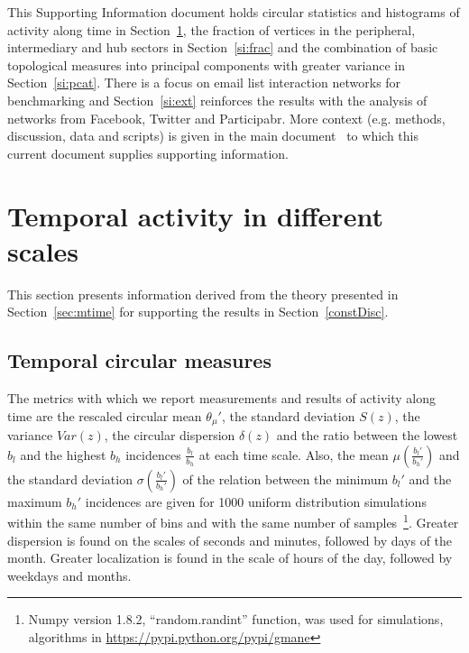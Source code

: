 \documentclass[%
 aip,
 jmp,%
 amsmath,amssymb,
 reprint,%
 floatfix,
]{revtex4-1}
\begin{document}
\date{\today}%

\maketitle

\tableofcontents


\vfill
\newpage

This Supporting Information document holds circular statistics and histograms of activity along time in Section~\ref{sec:time},
the fraction of vertices in the peripheral, intermediary and hub sectors in Section~\ref{si:frac}
and the combination of basic topological measures into principal components with greater variance in Section~\ref{si:pcat}.
There is a focus on email list interaction networks for benchmarking and
Section~\ref{si:ext} reinforces the results with the analysis of networks from Facebook, Twitter and Participabr.
More context (e.g. methods, discussion, data and scripts) is given in the main document~\cite{tpaper}
to which this current document supplies supporting information.

\section{Temporal activity in different scales}\label{sec:time}
This section presents information derived from the theory presented in Section~\ref*{sec:mtime}
for supporting the results in Section~\ref*{constDisc}.

\subsection{Temporal circular measures}\label{si:circ}
The metrics with which we report measurements and results
of activity along time are the rescaled circular mean $\theta_\mu'$,
the standard deviation $S(z)$, the variance $Var(z)$, the circular dispersion $\delta(z)$
and the ratio between the lowest $b_l$ and the highest $b_h$ incidences $\frac{b_l}{b_h}$ at each time scale.
Also, the mean $\mu(\frac{b_l'}{b_h'})$ and 
the standard deviation $\sigma(\frac{b_l'}{b_h'})$ 
of the relation between the minimum $b_l'$ and the maximum $b_h'$ incidences
are given for 1000 uniform distribution simulations within the 
same number of bins and with the same number of samples~\footnote{Numpy version 1.8.2, ``random.randint'' function, was used for simulations, algorithms in \url{https://pypi.python.org/pypi/gmane}}.
Greater dispersion is found on the scales of seconds and minutes, followed
by days of the month.
Greater localization is found in the scale of hours of the day, followed by weekdays and months.
\end{document}
